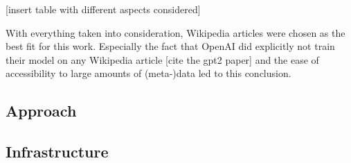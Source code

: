 [insert table with different aspects considered]

With everything taken into consideration, Wikipedia articles were chosen as the best fit for this work. 
Especially the fact that OpenAI did explicitly not train their model on any Wikipedia article [cite the gpt2 paper] 
and the ease of accessibility to large amounts of (meta-)data led to this conclusion.



\subsection{Approach}
\label{sec:approach}

\subsection{Infrastructure}
\label{sec:infrastructure}